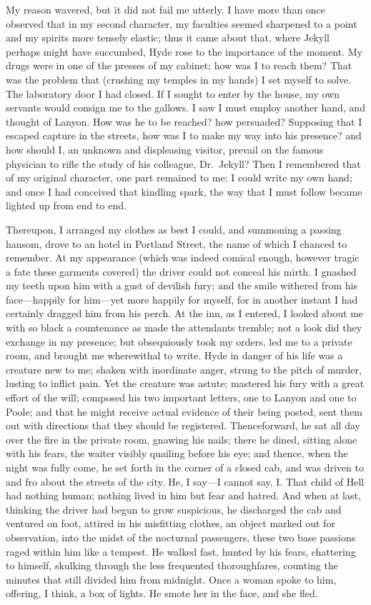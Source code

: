 \documentclass[12pt,openright]{book}
\begin{document}
My reason wavered, but it did not fail me utterly. I have more than once observed that in my second character, my faculties seemed sharpened to a point and my spirits more tensely elastic; thus it came about that, where Jekyll perhaps might have succumbed, Hyde rose to the importance of the moment. My drugs were in one of the presses of my cabinet; how was I to reach them? That was the problem that (crushing my temples in my hands) I set myself to solve. The laboratory door I had closed. If I sought to enter by the house, my own servants would consign me to the gallows. I saw I must employ another hand, and thought of Lanyon. How was he to be reached? how persuaded? Supposing that I escaped capture in the streets, how was I to make my way into his presence? and how should I, an unknown and displeasing visitor, prevail on the famous physician to rifle the study of his colleague, Dr. Jekyll? Then I remembered that of my original character, one part remained to me: I could write my own hand; and once I had conceived that kindling spark, the way that I must follow became lighted up from end to end.

Thereupon, I arranged my clothes as best I could, and summoning a passing hansom, drove to an hotel in Portland Street, the name of which I chanced to remember. At my appearance (which was indeed comical enough, however tragic a fate these garments covered) the driver could not conceal his mirth. I gnashed my teeth upon him with a gust of devilish fury; and the smile withered from his face—happily for him—yet more happily for myself, for in another instant I had certainly dragged him from his perch. At the inn, as I entered, I looked about me with so black a countenance as made the attendants tremble; not a look did they exchange in my presence; but obsequiously took my orders, led me to a private room, and brought me wherewithal to write. Hyde in danger of his life was a creature new to me; shaken with inordinate anger, strung to the pitch of murder, lusting to inflict pain. Yet the creature was astute; mastered his fury with a great effort of the will; composed his two important letters, one to Lanyon and one to Poole; and that he might receive actual evidence of their being posted, sent them out with directions that they should be registered. Thenceforward, he sat all day over the fire in the private room, gnawing his nails; there he dined, sitting alone with his fears, the waiter visibly quailing before his eye; and thence, when the night was fully come, he set forth in the corner of a closed cab, and was driven to and fro about the streets of the city. He, I say—I cannot say, I. That child of Hell had nothing human; nothing lived in him but fear and hatred. And when at last, thinking the driver had begun to grow suspicious, he discharged the cab and ventured on foot, attired in his misfitting clothes, an object marked out for observation, into the midst of the nocturnal passengers, these two base passions raged within him like a tempest. He walked fast, hunted by his fears, chattering to himself, skulking through the less frequented thoroughfares, counting the minutes that still divided him from midnight. Once a woman spoke to him, offering, I think, a box of lights. He smote her in the face, and she fled.
\end{document}
